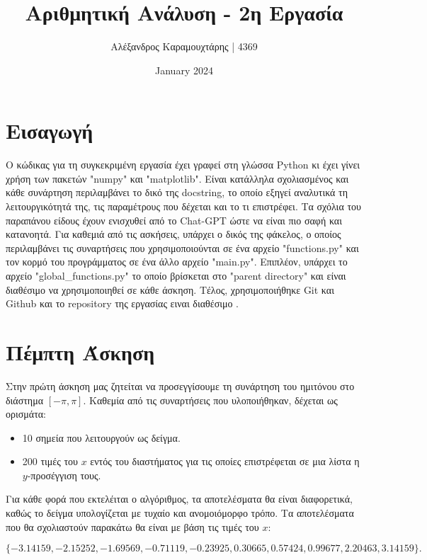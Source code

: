 \documentclass{article}
\title{Αριθμητική Ανάλυση - 2η Εργασία}
\author{Αλέξανδρος Καραμουχτάρης | 4369}
\date{January 2024}
\begin{document}
\maketitle

\setcounter{section}{4}
\section*{Εισαγωγή}
\begin{center}
Ο κώδικας για τη συγκεκριμένη εργασία έχει γραφεί στη γλώσσα Python κι έχει γίνει χρήση των πακετών "numpy" και "matplotlib". Είναι κατάλληλα σχολιασμένος και κάθε συνάρτηση περιλαμβάνει το δικό της docstring, το οποίο εξηγεί αναλυτικά τη λειτουργικότητά της, τις παραμέτρους που δέχεται και το τι επιστρέφει. Τα σχόλια του παραπάνου είδους έχουν ενισχυθεί από το Chat-GPT ώστε να είναι πιο σαφή και κατανοητά. Για καθεμιά από τις ασκήσεις, υπάρχει ο δικός της φάκελος, ο οποίος περιλαμβάνει τις συναρτήσεις που χρησιμοποιούνται σε ένα αρχείο "functions.py" και τον κορμό του προγράμματος σε ένα άλλο αρχείο "main.py". Επιπλέον, υπάρχει το αρχείο "global\_functions.py" το οποίο βρίσκεται στο "parent directory" και είναι διαθέσιμο να χρησιμοποιηθεί σε κάθε άσκηση. Τέλος, χρησιμοποιήθηκε Git και Github και το repository της εργασίας ειναι διαθέσιμο \href{https://github.com/AlexandrosKaram/Numerical-Analysis-2.git}{\color{blue}{εδώ}}.
\end{center}

\section{Πέμπτη Άσκηση}
Στην πρώτη άσκηση μας ζητείται να προσεγγίσουμε τη συνάρτηση του ημιτόνου στο διάστημα \([-π, π]\). Καθεμία από τις συναρτήσεις που υλοποιήθηκαν, δέχεται ως ορισμάτα:

\begin{itemize}
  \item 10 σημεία που λειτουργούν ως δείγμα.
  \item 200 τιμές του \( x \) εντός του διαστήματος για τις οποίες επιστρέφεται σε μια λίστα η \( y \)-προσέγγιση τους.
\end{itemize}

Για κάθε φορά που εκτελέιται ο αλγόριθμος, τα αποτελέσματα θα είναι διαφορετικά, καθώς το δείγμα υπολογίζεται με τυχαίο και ανομοιόμορφο τρόπο. Τα αποτελέσματα που θα σχολιαστούν παρακάτω θα είναι με βάση τις τιμές του \( x \):

\[
\{-3.14159, -2.15252, -1.69569, -0.71119, -0.23925, 0.30665, 0.57424, 0.99677, 2.20463, 3.14159\}.
\]
\end{document}
